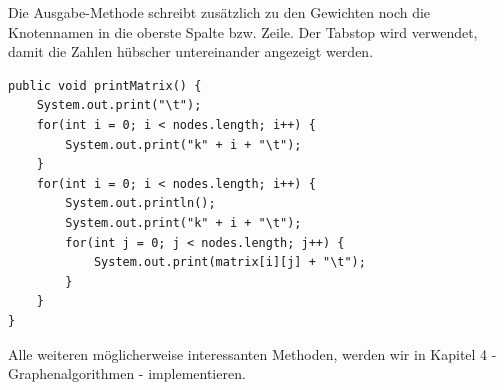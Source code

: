 \documentclass{article}
\begin{document}
Die Ausgabe-Methode schreibt zusätzlich zu den Gewichten noch die Knotennamen in die oberste Spalte bzw. Zeile. Der Tabstop wird verwendet, damit die Zahlen hübscher untereinander angezeigt werden. 
\begin{verbatim}
public void printMatrix() {
    System.out.print("\t");
    for(int i = 0; i < nodes.length; i++) {
        System.out.print("k" + i + "\t");
    }
    for(int i = 0; i < nodes.length; i++) {
        System.out.println();
        System.out.print("k" + i + "\t");
        for(int j = 0; j < nodes.length; j++) {
            System.out.print(matrix[i][j] + "\t");
        }
    }
}
\end{verbatim}

Alle weiteren möglicherweise interessanten Methoden, werden wir in Kapitel 4 - Graphenalgorithmen - implementieren. 
\end{document}
